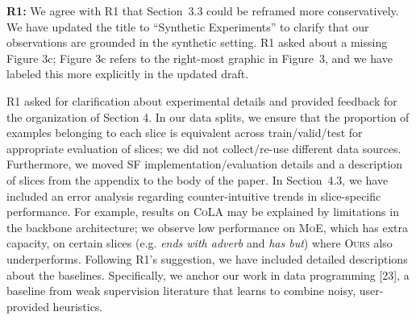 \documentclass{article}
\newcommand{\yell}[1]{\textcolor{red}{#1}}
\begin{document}


\textbf{R1:} We agree with R1 that Section~3.3 could be reframed more conservatively.
We have updated the title to ``Synthetic Experiments'' to clarify that our observations are grounded in the synthetic setting. 
R1 asked about a missing Figure 3c; Figure 3c refers to the right-most graphic in Figure~3, and we have labeled this more explicitly in the updated draft.

R1 asked for clarification about experimental details and provided feedback for the organization of Section 4. 
In our data splits, we ensure that the proportion of examples belonging to each slice is equivalent across train/valid/test for appropriate evaluation of slices; we did not collect/re-use different data sources.
Furthermore, we moved SF implementation/evaluation details and a description of slices from the appendix to the body of the paper.  
In Section~4.3, we have included an error analysis regarding counter-intuitive trends in slice-specific performance.
For example, results on \textsc{CoLA} may be explained by limitations in the backbone architecture; we observe low performance on \textsc{MoE}, which has extra capacity, on certain slices (e.g. \textit{ends with adverb} and \textit{has but}) where \textsc{Ours} also underperforms.
Following R1's suggestion, we have included detailed descriptions about the baselines.
Specifically, we anchor our work in data programming [23], a baseline from weak supervision literature that learns to combine noisy, user-provided heuristics.
\end{document}
